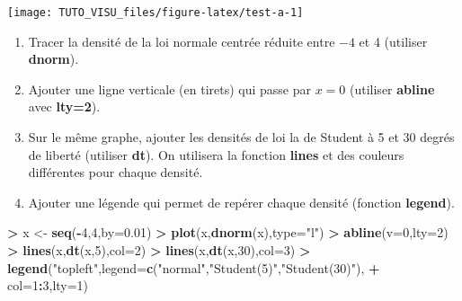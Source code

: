 \documentclass[]{article}
\newenvironment{Shaded}{\begin{snugshade}}{\end{snugshade}}
\newcommand{\DataTypeTok}[1]{\textcolor[rgb]{0.13,0.29,0.53}{#1}}
\newcommand{\DecValTok}[1]{\textcolor[rgb]{0.00,0.00,0.81}{#1}}
\newcommand{\FloatTok}[1]{\textcolor[rgb]{0.00,0.00,0.81}{#1}}
\newcommand{\KeywordTok}[1]{\textcolor[rgb]{0.13,0.29,0.53}{\textbf{#1}}}
\newcommand{\NormalTok}[1]{#1}
\newcommand{\OperatorTok}[1]{\textcolor[rgb]{0.81,0.36,0.00}{\textbf{#1}}}
\newcommand{\StringTok}[1]{\textcolor[rgb]{0.31,0.60,0.02}{#1}}
\providecommand{\tightlist}{%
  \setlength{\itemsep}{0pt}\setlength{\parskip}{0pt}}
\theoremstyle{definition}
\theoremstyle{definition}
\theoremstyle{definition}
\theoremstyle{remark}
\let\BeginKnitrBlock\begin \let\EndKnitrBlock\end
\begin{document}
\begin{center}\texttt{[image: TUTO\_VISU\_files/figure-latex/test-a-1]} \end{center}

\BeginKnitrBlock{exercise}[Tracé de densités]
\protect\hypertarget{exr:exo2}{}{\label{exr:exo2} \iffalse (Tracé de densités) \fi{} }
\EndKnitrBlock{exercise}

\begin{enumerate}
\def\labelenumi{\arabic{enumi}.}
\tightlist
\item
  Tracer la densité de la loi normale centrée réduite entre \(-4\) et 4 (utiliser \textbf{dnorm}).
\item
  Ajouter une ligne verticale (en tirets) qui passe par \(x=0\) (utiliser \textbf{abline} avec \textbf{lty=2}).
\item
  Sur le même graphe, ajouter les densités de loi la de Student à 5 et 30 degrés de liberté (utiliser \textbf{dt}). On utilisera la fonction \textbf{lines} et des couleurs différentes pour chaque densité.
\item
  Ajouter une légende qui permet de repérer chaque densité (fonction \textbf{legend}).
\end{enumerate}

\begin{Shaded}
\begin{Highlighting}[]
\OperatorTok{>}\StringTok{ }\NormalTok{x <-}\StringTok{ }\KeywordTok{seq}\NormalTok{(}\OperatorTok{-}\DecValTok{4}\NormalTok{,}\DecValTok{4}\NormalTok{,}\DataTypeTok{by=}\FloatTok{0.01}\NormalTok{)}
\OperatorTok{>}\StringTok{ }\KeywordTok{plot}\NormalTok{(x,}\KeywordTok{dnorm}\NormalTok{(x),}\DataTypeTok{type=}\StringTok{"l"}\NormalTok{)}
\OperatorTok{>}\StringTok{ }\KeywordTok{abline}\NormalTok{(}\DataTypeTok{v=}\DecValTok{0}\NormalTok{,}\DataTypeTok{lty=}\DecValTok{2}\NormalTok{)}
\OperatorTok{>}\StringTok{ }\KeywordTok{lines}\NormalTok{(x,}\KeywordTok{dt}\NormalTok{(x,}\DecValTok{5}\NormalTok{),}\DataTypeTok{col=}\DecValTok{2}\NormalTok{)}
\OperatorTok{>}\StringTok{ }\KeywordTok{lines}\NormalTok{(x,}\KeywordTok{dt}\NormalTok{(x,}\DecValTok{30}\NormalTok{),}\DataTypeTok{col=}\DecValTok{3}\NormalTok{)}
\OperatorTok{>}\StringTok{ }\KeywordTok{legend}\NormalTok{(}\StringTok{"topleft"}\NormalTok{,}\DataTypeTok{legend=}\KeywordTok{c}\NormalTok{(}\StringTok{"normal"}\NormalTok{,}\StringTok{"Student(5)"}\NormalTok{,}\StringTok{"Student(30)"}\NormalTok{),}
\OperatorTok{+}\StringTok{        }\DataTypeTok{col=}\DecValTok{1}\OperatorTok{:}\DecValTok{3}\NormalTok{,}\DataTypeTok{lty=}\DecValTok{1}\NormalTok{)}
\end{Highlighting}
\end{Shaded}
\end{document}
